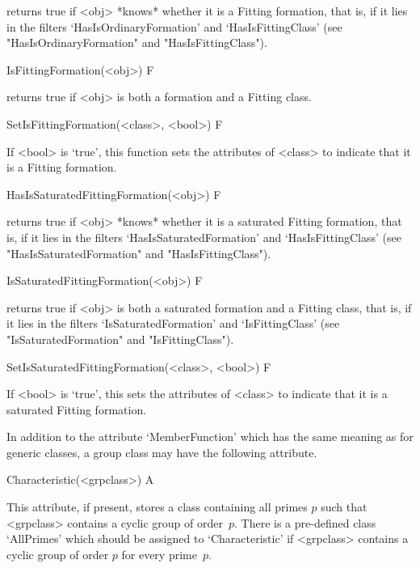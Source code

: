 returns true if <obj> *knows* whether it is a Fitting formation, that is, if it lies in the
filters `HasIsOrdinaryFormation' and  `HasIsFittingClass' (see "HasIsOrdinaryFormation" and
"HasIsFittingClass").


\>IsFittingFormation(<obj>) F

returns true if <obj> is both a formation and a Fitting class.

\>SetIsFittingFormation(<class>, <bool>) F

If <bool> is `true', this function sets the attributes of <class> to indicate
that it is a Fitting formation.

\>HasIsSaturatedFittingFormation(<obj>)  F

returns true if <obj>  *knows* whether it is a saturated Fitting formation, that is, if it lies
in the filters `HasIsSaturatedFormation' and  `HasIsFittingClass' (see "HasIsSaturatedFormation"
and "HasIsFittingClass").

\>IsSaturatedFittingFormation(<obj>) F

returns true if <obj> is both a saturated formation and a Fitting class, that is, if it lies 
in the filters `IsSaturatedFormation' and  `IsFittingClass' (see "IsSaturatedFormation"
and "IsFittingClass").

\>SetIsSaturatedFittingFormation(<class>, <bool>) F

If <bool> is `true', this sets the attributes of <class> to indicate that it
is a saturated Fitting formation.


\null


In addition to the attribute `MemberFunction' which has the same meaning as
for generic classes, a group class may have the following attribute.

\>Characteristic(<grpclass>) A

This attribute, if present, stores a class containing all primes $p$ such
that <grpclass> contains a cyclic group of order~$p$. There is a pre-defined
class `AllPrimes' which should be assigned to `Characteristic' if <grpclass>
contains a cyclic group of order $p$ for every prime~$p$.


